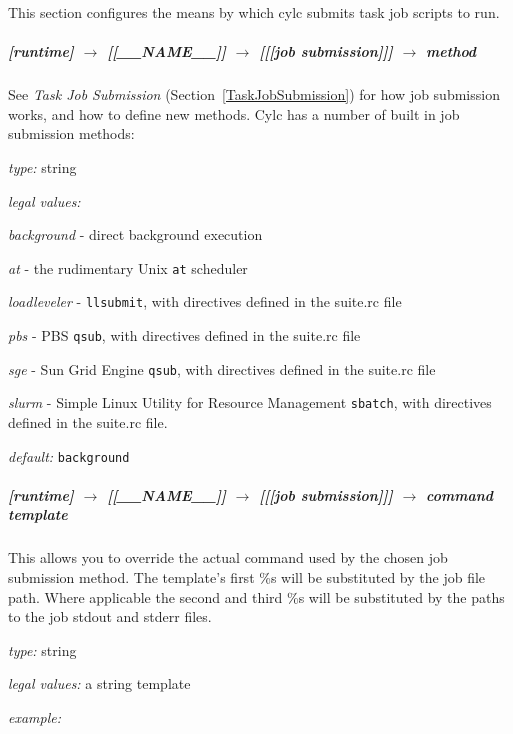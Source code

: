 This section configures the means by which cylc submits task job scripts to run.

\subparagraph[method]{[runtime] $\rightarrow$ [[\_\_NAME\_\_]] $\rightarrow$ [[[job submission]]] $\rightarrow$ method}
\label{RuntimeJobSubMethods}

See {\em Task Job Submission} (Section~\ref{TaskJobSubmission}) 
for how job submission works, and how to define new methods.
Cylc has a number of built in job submission methods:
\begin{myitemize}
\item {\em type:} string
\item {\em legal values:} 
   \begin{myitemize}
       \item {\em background} - direct background execution
       \item {\em at} - the rudimentary Unix \lstinline=at= scheduler
       \item {\em loadleveler} - \lstinline=llsubmit=, with directives defined in the suite.rc file 
       \item {\em pbs} - PBS \lstinline=qsub=, with directives defined in the suite.rc file 
       \item {\em sge} - Sun Grid Engine \lstinline=qsub=, with directives defined in the suite.rc file 
       \item {\em slurm} - Simple Linux Utility for Resource Management \lstinline=sbatch=, with directives defined in the suite.rc file.
   \end{myitemize}
\item {\em default:} \lstinline=background=
\end{myitemize}

\subparagraph[command template]{[runtime] $\rightarrow$ [[\_\_NAME\_\_]] $\rightarrow$ [[[job submission]]] $\rightarrow$ command template}

This allows you to override the actual command used by the chosen job
submission method. The template's first \%s will be substituted by the
job file path.  Where applicable the second and third \%s will be
substituted by the paths to the job stdout and stderr files.

\begin{myitemize}
\item {\em type:} string
\item {\em legal values:} a string template
\item {\em example:} \lstinline@llsubmit %s@
\end{myitemize}

